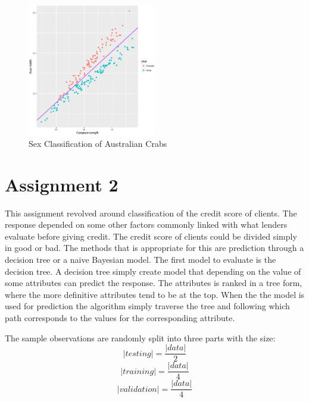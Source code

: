 \documentclass[a4paper, twocolumn]{article}
\begin{document}
        \begin{figure}
          \centering
            \caption{Sex Classification of Australian Crabs}
          \label{fig:boundarylr}
          \includegraphics[width=0.5\textwidth]{share/boundarylr.eps}
        \end{figure}

    \section*{Assignment 2}
	This assignment revolved around classification of the credit score of clients. The response depended on some other factors commonly linked with what lenders evaluate before giving credit. 
	The credit score of clients could be divided simply in good or bad.\newline
    The methods that is appropriate for this are prediction through a decision tree or a naive Bayesian model. The first model to evaluate is the decision tree. A decision tree simply create  
	model that depending on the value of some attributes can predict the response. The attributes is ranked in a tree form, where the more definitive attributes tend to be at the top. When the 
	the model is used for prediction the algorithm simply traverse the tree and following which path corresponds to the values for the corresponding attribute.

	The sample observations are randomly split into three parts with the size:
	\begin{equation}
		\left | testing \right | = \frac{\left | data \right |}{2}
	\end{equation}
	\begin{equation}
		 \left | training \right | = \frac{\left | data \right |}{4}
	\end{equation}
	\begin{equation}
	 \left | validation \right | = \frac{\left | data \right |}{4}
	\end{equation}
\end{document}
